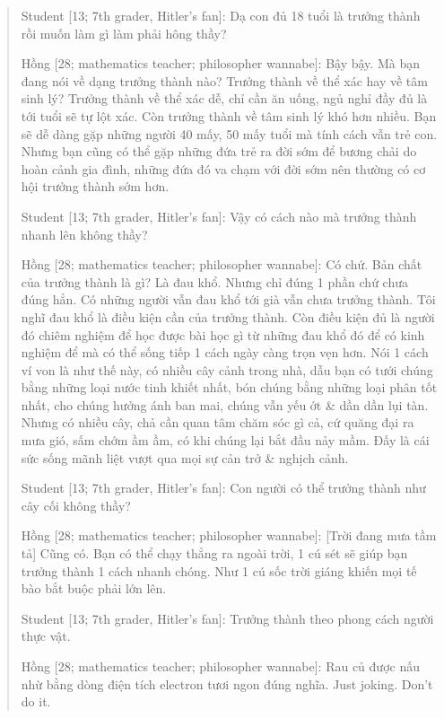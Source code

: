 \documentclass[12pt]{article}
\begin{document}
\begin{quote}
	{\sf Student [13; 7th grader, Hitler's fan]}: Dạ con đủ 18 tuổi là trưởng thành rồi muốn làm gì làm phải hông thầy?
	
	{\sf Hồng [28; mathematics teacher; philosopher wannabe]}: Bậy bậy. Mà bạn đang nói về dạng trưởng thành nào? Trưởng thành về thể xác hay về tâm sinh lý? Trưởng thành về thể xác dễ, chỉ cần ăn uống, ngủ nghỉ đầy đủ là tới tuổi sẽ tự lột xác. Còn trưởng thành về tâm sinh lý khó hơn nhiều. Bạn sẽ dễ dàng gặp những người 40 mấy, 50 mấy tuổi mà tính cách vẫn trẻ con. Nhưng bạn cũng có thể gặp những đứa trẻ ra đời sớm để bương chải do hoàn cảnh gia đình, những đứa đó va chạm với đời sớm nên thường có cơ hội trưởng thành sớm hơn.
	
	{\sf Student [13; 7th grader, Hitler's fan]}: Vậy có cách nào mà trưởng thành nhanh lên không thầy?
	
	{\sf Hồng [28; mathematics teacher; philosopher wannabe]}: Có chứ. Bản chất của trưởng thành là gì? Là đau khổ. Nhưng chỉ đúng 1 phần chứ chưa đúng hẳn. Có những người vẫn đau khổ tới già vẫn chưa trưởng thành. Tôi nghĩ đau khổ là điều kiện cần của trưởng thành. Còn điều kiện đủ là người đó chiêm nghiệm để học được bài học gì từ những đau khổ đó để có kinh nghiệm để mà có thể sống tiếp 1 cách ngày càng trọn vẹn hơn. Nói 1 cách ví von là như thế này, có nhiều cây cảnh trong nhà, dẫu bạn có tưới chúng bằng những loại nước tinh khiết nhất, bón chúng bằng những loại phân tốt nhất, cho chúng hưởng ánh ban mai, chúng vẫn yếu ớt \& dần dần lụi tàn. Nhưng có nhiều cây, chả cần quan tâm chăm sóc gì cả, cứ quăng đại ra mưa gió, sấm chớm ầm ầm, có khi chúng lại bắt đầu nảy mầm. Đấy là cái sức sống mãnh liệt vượt qua mọi sự cản trở \& nghịch cảnh. 
	
	{\sf Student [13; 7th grader, Hitler's fan]}: Con người có thể trưởng thành như cây cối không thầy?
	
	{\sf Hồng [28; mathematics teacher; philosopher wannabe]}: [Trời đang mưa tầm tả] Cũng có. Bạn có thể chạy thẳng ra ngoài trời, 1 cú sét sẽ giúp bạn trưởng thành 1 cách nhanh chóng. Như 1 cú sốc trời giáng khiến mọi tế bào bắt buộc phải lớn lên.
	
	{\sf Student [13; 7th grader, Hitler's fan]}: Trưởng thành theo phong cách người thực vật.
	
	{\sf Hồng [28; mathematics teacher; philosopher wannabe]}: Rau củ được nấu nhừ bằng dòng điện tích electron tươi ngon đúng nghĩa. Just joking. Don't do it.
\end{quote}
\end{document}
